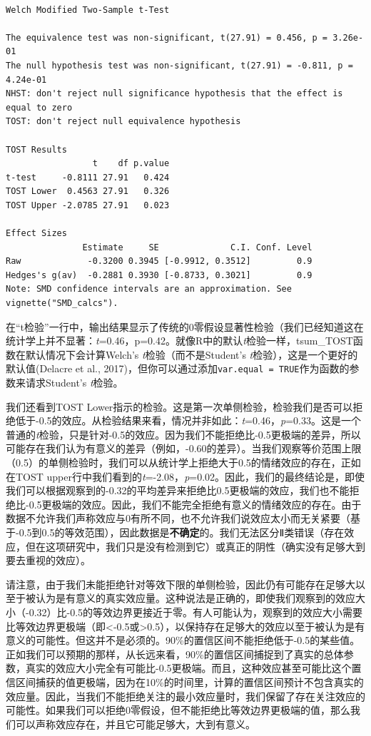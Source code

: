 \documentclass[
  letterpaper,
  DIV=11,
  numbers=noendperiod]{scrreprt}
\begin{document}
\begin{verbatim}

Welch Modified Two-Sample t-Test

The equivalence test was non-significant, t(27.91) = 0.456, p = 3.26e-01
The null hypothesis test was non-significant, t(27.91) = -0.811, p = 4.24e-01
NHST: don't reject null significance hypothesis that the effect is equal to zero 
TOST: don't reject null equivalence hypothesis

TOST Results 
                 t    df p.value
t-test     -0.8111 27.91   0.424
TOST Lower  0.4563 27.91   0.326
TOST Upper -2.0785 27.91   0.023

Effect Sizes 
               Estimate     SE              C.I. Conf. Level
Raw             -0.3200 0.3945 [-0.9912, 0.3512]         0.9
Hedges's g(av)  -0.2881 0.3930 [-0.8733, 0.3021]         0.9
Note: SMD confidence intervals are an approximation. See vignette("SMD_calcs").
\end{verbatim}

在``t检验''一行中，输出结果显示了传统的0零假设显著性检验（我们已经知道这在统计学上并不显著：\emph{t}=0.46，p=0.42。就像R中的默认\emph{t}检验一样，tsum\_TOST函数在默认情况下会计算Welch's
\emph{t}检验（而不是Student's
\emph{t}检验），这是一个更好的默认值(Delacre et al.,
2017)，但你可以通过添加\texttt{var.equal\ =\ TRUE}作为函数的参数来请求Student's
\emph{t}检验。

我们还看到TOST
Lower指示的检验。这是第一次单侧检验，检验我们是否可以拒绝低于-0.5的效应。从检验结果来看，情况并非如此：\emph{t}=0.46，\emph{p}=0.33。这是一个普通的\emph{t}检验，只是针对-0.5的效应。因为我们不能拒绝比-0.5更极端的差异，所以可能存在我们认为有意义的差异（例如，-0.60的差异）。当我们观察等价范围上限（0.5）的单侧检验时，我们可以从统计学上拒绝大于0.5的情绪效应的存在，正如在TOST
upper行中我们看到的\emph{t}=-2.08，\emph{p}=0.02。因此，我们的最终结论是，即使我们可以根据观察到的-0.32的平均差异来拒绝比0.5更极端的效应，我们也不能拒绝比-0.5更极端的效应。因此，我们不能完全拒绝有意义的情绪效应的存在。由于数据不允许我们声称效应与0有所不同，也不允许我们说效应太小而无关紧要（基于-0.5到0.5的等效范围），因此数据是\textbf{不确定}的。我们无法区分Ⅱ类错误（存在效应，但在这项研究中，我们只是没有检测到它）或真正的阴性（确实没有足够大到要去重视的效应）。

请注意，由于我们未能拒绝针对等效下限的单侧检验，因此仍有可能存在足够大以至于被认为是有意义的真实效应量。这种说法是正确的，即使我们观察到的效应大小（-0.32）比-0.5的等效边界更接近于零。有人可能认为，观察到的效应大小需要比等效边界更极端（即\textless-0.5或\textgreater0.5），以保持存在足够大的效应以至于被认为是有意义的可能性。但这并不是必须的。90\%的置信区间不能拒绝低于-0.5的某些值。正如我们可以预期的那样，从长远来看，90\%的置信区间捕捉到了真实的总体参数，真实的效应大小完全有可能比-0.5更极端。而且，这种效应甚至可能比这个置信区间捕获的值更极端，因为在10\%的时间里，计算的置信区间预计不包含真实的效应量。因此，当我们不能拒绝关注的最小效应量时，我们保留了存在关注效应的可能性。如果我们可以拒绝0零假设，但不能拒绝比等效边界更极端的值，那么我们可以声称效应存在，并且它可能足够大，大到有意义。
\end{document}
